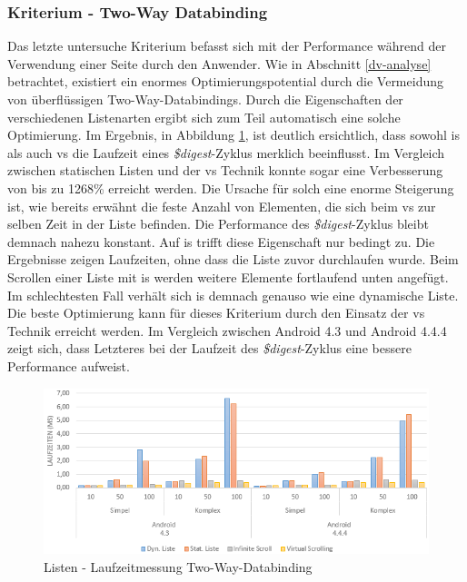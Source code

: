 \subsubsection{Kriterium - Two-Way Databinding}
	Das letzte untersuche Kriterium befasst sich mit der Performance während der Verwendung einer Seite durch den Anwender. Wie in Abschnitt \ref{dv-analyse} betrachtet, existiert ein enormes Optimierungspotential durch die Vermeidung von überflüssigen Two-Way-Databindings. Durch die Eigenschaften der verschiedenen Listenarten ergibt sich zum Teil automatisch eine solche Optimierung. Im Ergebnis, in Abbildung \ref{lists-runtime-digest}, ist deutlich ersichtlich, dass sowohl \gls{is} als auch \gls{vs} die Laufzeit eines \emph{\$digest}-Zyklus merklich beeinflusst. Im Vergleich zwischen statischen Listen und der \gls{vs} Technik konnte sogar eine Verbesserung von bis zu 1268\% erreicht werden. Die Ursache für solch eine enorme Steigerung ist, wie bereits erwähnt die feste Anzahl von Elementen, die sich beim \gls{vs} zur selben Zeit in der Liste befinden. Die Performance des \emph{\$digest}-Zyklus bleibt demnach nahezu konstant. Auf \gls{is} trifft diese Eigenschaft nur bedingt zu. Die Ergebnisse zeigen Laufzeiten, ohne dass die Liste zuvor durchlaufen wurde. Beim Scrollen einer Liste mit \gls{is} werden weitere Elemente fortlaufend unten angefügt. Im schlechtesten Fall verhält sich \gls{is} demnach genauso wie eine dynamische Liste. Die beste Optimierung kann für dieses Kriterium durch den Einsatz der \gls{vs} Technik erreicht werden. Im Vergleich zwischen Android 4.3 und Android 4.4.4 zeigt sich, dass Letzteres bei der Laufzeit des \emph{\$digest}-Zyklus eine bessere Performance aufweist. 
\begin{figure}[h]
	\centering
	\includegraphics[scale=0.7]{Bilder/Diagramme/List-digest.png}
	\caption{Listen - Laufzeitmessung Two-Way-Databinding}
	\label{lists-runtime-digest}
\end{figure}


